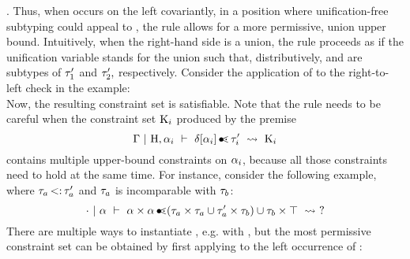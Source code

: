 \tyunion{\tyint}{\tyflt}.
Thus, when \va occurs on the left covariantly, in a position where 
unification-free subtyping could appeal to ,
the rule  allows for a more permissive, union upper bound.
Intuitively, when the right-hand side is a union, the rule proceeds as 
if the unification variable \va stands for the union 
such that, distributively, \plug{} and \plug{}
are subtypes of $\tau'_1$ and $\tau'_2,$ respectively.
Consider the application of  to the right-to-left check
in the example:\\
Now, the resulting constraint set
\ctrset{\ctrsub{\va}{\tyunion\tyint\tyflt}, 
\ctrsub{\tyint}{\va}, \ctrsub{\tyflt}{\va}}
is satisfiable.
Note that the rule  needs to be careful when 
the constraint set $\mathrm{K}_i$ produced by the premise
\[\Gamma~\vert~\mathrm{H},\alpha_i\ \vdash\ \delta[\alpha_i] \operatorname{\bullet\!\!\lessdot} \tau'_i\ \rightsquigarrow\ \mathrm{K}_i\]
contains multiple upper-bound constraints on $\alpha_i$, because all those
constraints need to hold at the same time.
For instance, consider the following example,
where $\tau_a \operatorname{<:} \tau'_a$ and $\tau_a$ is incomparable with $\tau_b$:
\[
    \cdot~\vert~\alpha\ \vdash\ \alpha \times \alpha \operatorname{\bullet\!\!\lessdot} (\tau_a \times \tau_a \cup \tau'_a \times \tau_b) \cup \tau_b \times \top\ \rightsquigarrow\  ? 
\]
There are multiple ways to instantiate \va, e.g. with \tybot,
but the most permissive constraint set can be obtained by first
applying  to the left occurrence of \va:\\
